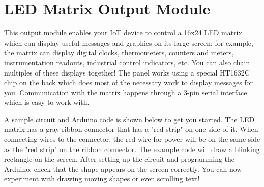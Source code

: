 
\clearpage
\section{LED Matrix Output Module}
\label{sec-output-ledmatrix}

This output module enables your IoT device to control a 16x24 LED matrix
which can display useful messages and graphics on its large screen; for
example, the matrix can display digital clocks, thermometers, counters
and meters, instrumentation readouts, industrial control indicators,
etc. You can also chain multiples of these displays together! The panel
works using a special HT1632C chip on the back which does most of the
necessary work to display messages for you. Communication with the
matrix happens through a 3-pin serial interface which is easy to work
with.

A sample circuit and Arduino code is shown below to get you started.
The LED matrix has a gray ribbon connector that has a "red strip" on one
side of it. When connecting wires to the connector, the red wire for
power will be on the same side as the "red strip" on the ribbon
connector. The example code will draw a blinking rectangle on the
screen. After setting up the circuit and programming the Arduino, check
that the shape appears on the screen correctly. You can now experiment
with drawing moving shapes or even scrolling text!

